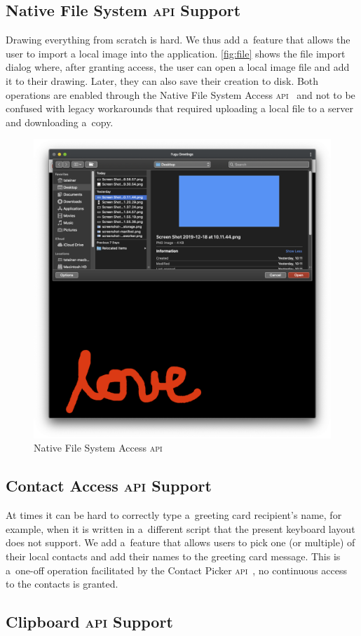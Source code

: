 \documentclass[sigconf, anonymous]{acmart}
\begin{document}
\subsection{Native File System \textsc{api} Support}

Drawing everything from scratch is hard.
We thus add a~feature that allows the user to import a local image into the application.
\autoref{fig:file} shows the file import dialog where, after granting access,
the user can open a local image file and add it to their drawing.
Later, they can also save their creation to disk.
Both operations are enabled through the Native File System Access \textsc{api}~\cite{kruisselbrink19}
and not to be confused with legacy workarounds that required uploading a local file to a server
and downloading a~copy.

\begin{figure}[hbt]
  \includegraphics[width=0.5\columnwidth]{file.png}
  \caption{Native File System Access \textsc{api}}
  \label{fig:file}
\end{figure}

\subsection{Contact Access \textsc{api} Support}

At times it can be hard to correctly type a~greeting card recipient's name,
for example, when it is written in a~different script
that the present keyboard layout does not support.
We add a~feature that allows users to pick one (or multiple) of their local contacts
and add their names to the greeting card message.
This is a~one-off operation facilitated by the Contact Picker \textsc{api}~\cite{beverloo19},
no continuous access to the contacts is granted.

\subsection{Clipboard \textsc{api} Support}
\end{document}
